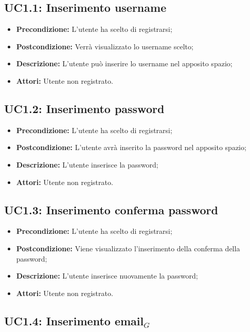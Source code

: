 \subsection{ UC1.1: Inserimento username}

\begin{itemize}
	\item \textbf{Precondizione:} L'utente ha scelto di registrarsi;
	\item \textbf{Postcondizione:} Verrà visualizzato lo username scelto;
	\item \textbf{Descrizione:} L'utente può inserire lo username nel apposito spazio;
	\item \textbf{Attori:} Utente non registrato.
\end{itemize}
\subsection{ UC1.2: Inserimento password}

\begin{itemize}
	\item \textbf{Precondizione:} L'utente ha scelto di registrarsi;
	\item \textbf{Postcondizione:} L'utente avrà inserito la password nel apposito spazio;
	\item \textbf{Descrizione:} L'utente inserisce la password;
	\item \textbf{Attori:} Utente non registrato.
\end{itemize}
\subsection{ UC1.3: Inserimento conferma password}

\begin{itemize}
	\item \textbf{Precondizione:} L'utente ha scelto di registrarsi;
	\item \textbf{Postcondizione:} Viene visualizzato l'inserimento della conferma della password;
	\item \textbf{Descrizione:} L'utente inserisce nuovamente la password;
	\item \textbf{Attori:} Utente non registrato.
\end{itemize}
\subsection{ UC1.4: Inserimento email$_G$}

